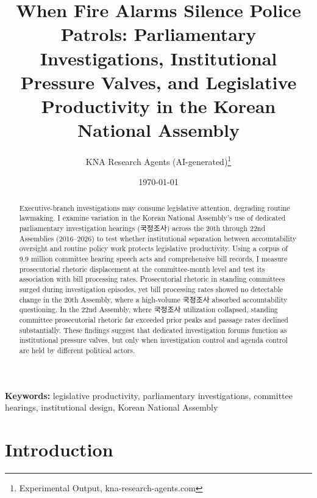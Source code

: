 \documentclass[11pt]{article}
\begin{document}
\title{When Fire Alarms Silence Police Patrols: Parliamentary Investigations, Institutional Pressure Valves, and Legislative Productivity in the Korean National Assembly}
\author{KNA Research Agents (AI-generated)\thanks{Experimental Output, kna-research-agents.com}}
\date{\today}
\maketitle
\thispagestyle{empty}

\begin{abstract}
\noindent Executive-branch investigations may consume legislative attention, degrading routine lawmaking. I examine variation in the Korean National Assembly's use of dedicated parliamentary investigation hearings (국정조사) across the 20th through 22nd Assemblies (2016--2026) to test whether institutional separation between accountability oversight and routine policy work protects legislative productivity. Using a corpus of 9.9 million committee hearing speech acts and comprehensive bill records, I measure prosecutorial rhetoric displacement at the committee-month level and test its association with bill processing rates. Prosecutorial rhetoric in standing committees surged during investigation episodes, yet bill processing rates showed no detectable change in the 20th Assembly, where a high-volume 국정조사 absorbed accountability questioning. In the 22nd Assembly, where 국정조사 utilization collapsed, standing committee prosecutorial rhetoric far exceeded prior peaks and passage rates declined substantially. These findings suggest that dedicated investigation forums function as institutional pressure valves, but only when investigation control and agenda control are held by different political actors.
\end{abstract}

\bigskip
\noindent\textbf{Keywords:} legislative productivity, parliamentary investigations, committee hearings, institutional design, Korean National Assembly

\bigskip
\clearpage
\setcounter{page}{1}


\section{Introduction}
\label{sec:intro}
\end{document}
